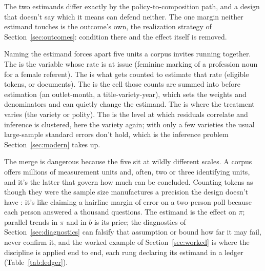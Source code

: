 The two estimands differ exactly by the policy-to-composition path, and a design that doesn't say which it means can defend neither. The one margin neither estimand touches is the outcome's own, the realization strategy of Section~\ref{sec:outcomes}: condition there and the effect itself is removed.

Naming the estimand forces apart five units a corpus invites running together. The  is the variable whose rate is at issue (feminine marking of a profession noun for a female referent). The  is what gets counted to estimate that rate (eligible tokens, or documents). The  is the cell those counts are summed into before estimation (an outlet-month, a title-variety-year), which sets the weights and denominators and can quietly change the estimand. The  is where the treatment varies (the variety or polity). The  is the level at which residuals correlate and inference is clustered, here the variety again; with only a few varieties the usual large-sample standard errors don't hold, which is the inference problem Section~\ref{sec:modern} takes up.

The merge is dangerous because the five sit at wildly different scales. A corpus offers millions of measurement units and, often, two or three identifying units, and it's the latter that govern how much can be concluded. Counting tokens as though they were the sample size manufactures a precision the design doesn't have \citep{BertrandDufloMullainathan2004}: it's like claiming a hairline margin of error on a two-person poll because each person answered a thousand questions. The estimand is the effect on $\pi$; parallel trends in $\pi$ and in $b$ is its price; the diagnostics of Section~\ref{sec:diagnostics} can falsify that assumption or bound how far it may fail, never confirm it, and the worked example of Section~\ref{sec:worked} is where the discipline is applied end to end, each rung declaring its estimand in a ledger (Table~\ref{tab:ledger}).
